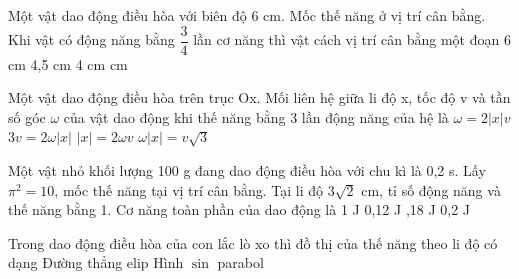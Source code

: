 \begin{ex}%
 Một vật dao động điều hòa với biên độ 6 cm. Mốc thế năng ở vị trí cân bằng. Khi vật có động năng bằng $\dfrac{3}{4}$ lần cơ năng thì vật cách vị trí cân bằng một đoạn
\choice
{6 cm}
{4,5 cm}
{4 cm}
{ cm}
\end{ex} 
\begin{ex}%
Một vật dao động điều hòa trên trục Ox. Mối liên hệ giữa li độ x, tốc độ v và tần số góc $ \omega $ của vật dao động khi thế năng bằng 3 lần động năng của hệ là
\choice
{$ \omega =2\left| x \right|v$}
{$ 3v=2\omega \left| x \right|$}
{$ \left| x \right|=2\omega v$}
{\True $ \omega \left| x \right|=v\sqrt{3}$}
\end{ex} 
\begin{ex}%
Một vật nhỏ khối lượng 100 g đang dao động điều hòa với chu kì là 0,2 s. Lấy $\pi^2 = 10$, mốc thế năng tại vị trí cân bằng. Tại li độ $3\sqrt{2}$ cm, tỉ số động năng và thế năng bằng 1. Cơ năng toàn phần của dao động là
\choice
{1 J}
{0,12 J}
{,18 J}
{0,2 J}
\end{ex} 
\begin{ex}%
Trong dao động điều hòa của con lắc lò xo thì đồ thị của thế năng theo li độ có dạng
\choice
{Đường thẳng}
{elip}
{Hình $\sin$}
{\True parabol}
\end{ex} 
